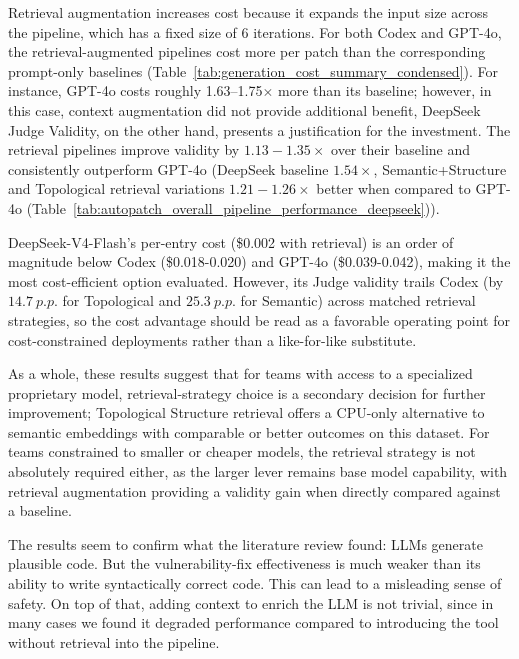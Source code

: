 Retrieval augmentation increases cost because it expands the input size across the pipeline, which has a fixed size of 6 iterations. 
For both Codex and GPT-4o, the retrieval-augmented pipelines cost more per patch than the corresponding prompt-only baselines (Table~\ref{tab:generation_cost_summary_condensed}). For instance, GPT-4o costs roughly 1.63–1.75$\times$ more than its baseline; however, in this case, context augmentation did not provide additional benefit, 
DeepSeek Judge Validity, on the other hand, presents a justification for the investment. The retrieval pipelines improve validity by $1.13-1.35\times$ over their baseline and consistently outperform GPT-4o (DeepSeek baseline $1.54\times$, Semantic+Structure and Topological retrieval variations $1.21-1.26\times$ better when compared to GPT-4o (Table~\ref{tab:autopatch_overall_pipeline_performance_deepseek})). 

DeepSeek-V4-Flash's per-entry cost (\$0.002 with retrieval) is an order of magnitude below Codex (\$0.018-0.020) and GPT-4o (\$0.039-0.042), making it the most cost-efficient option evaluated. However, its Judge validity trails Codex (by $14.7~p.p.$ for Topological and $25.3~p.p.$ for Semantic) across matched retrieval strategies, so the cost advantage should be read as a favorable operating point for cost-constrained deployments rather than a like-for-like substitute.

As a whole, these results suggest that for teams with access to a specialized proprietary model, retrieval-strategy choice is a secondary decision for further improvement; Topological Structure retrieval offers a CPU-only alternative to semantic embeddings with comparable or better outcomes on this dataset. 
For teams constrained to smaller or cheaper models, the retrieval strategy is not absolutely required either, as the larger lever remains base model capability,  with retrieval augmentation providing a validity gain when directly compared against a baseline.

The results seem to confirm what the literature review found: LLMs generate plausible code. But the vulnerability-fix effectiveness is much weaker than its ability to write syntactically correct code. This can lead to a misleading sense of safety. On top of that, adding context to enrich the LLM is not trivial, since in many cases we found it degraded performance compared to introducing the tool without retrieval into the pipeline.  

